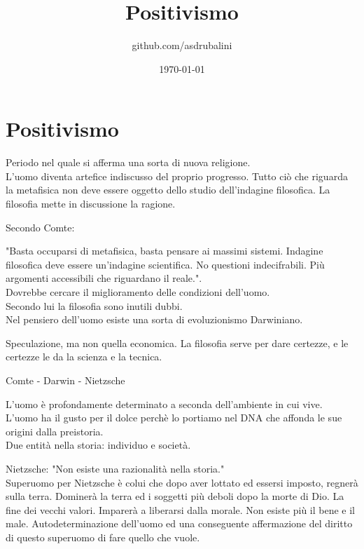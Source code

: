 \documentclass{article}
\title{Positivismo}
\author{github.com/asdrubalini}
\date{\today}
\begin{document}
    \maketitle

    \section{Positivismo}
    Periodo nel quale si afferma una sorta di nuova religione.\\
    L'uomo diventa artefice indiscusso del proprio progresso.
    Tutto ciò che riguarda la metafisica non deve essere oggetto dello studio dell'indagine filosofica. La filosofia mette in discussione la ragione.

    Secondo Comte:
    
    "Basta occuparsi di metafisica, basta pensare ai massimi sistemi. Indagine filosofica deve essere un'indagine scientifica. No questioni indecifrabili. Più argomenti accessibili che riguardano il reale.".\\
    Dovrebbe cercare il miglioramento delle condizioni dell'uomo.\\
    Secondo lui la filosofia sono inutili dubbi.\\
    Nel pensiero dell'uomo esiste una sorta di evoluzionismo Darwiniano.

    Speculazione, ma non quella economica.
    La filosofia serve per dare certezze, e le certezze le da la scienza e la tecnica.

    Comte - Darwin - Nietzsche

    L'uomo è profondamente determinato a seconda dell'ambiente in cui vive.\\
    L'uomo ha il gusto per il dolce perchè lo portiamo nel DNA che affonda le sue origini dalla preistoria.\\
    Due entità nella storia: individuo e società.

    Nietzsche: "Non esiste una razionalità nella storia."\\
    Superuomo per Nietzsche è colui che dopo aver lottato ed essersi imposto, regnerà sulla terra. Dominerà la terra ed i soggetti più deboli dopo la morte di Dio. La fine dei vecchi valori. Imparerà a liberarsi dalla morale. Non esiste più il bene e il male. Autodeterminazione dell'uomo ed una conseguente affermazione del diritto di questo superuomo di fare quello che vuole.
\end{document}
